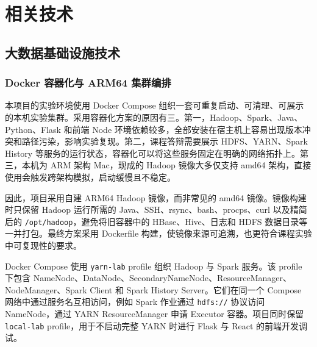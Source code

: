 
\chapter{相关技术}

\section{大数据基础设施技术}

\subsection{Docker 容器化与 ARM64 集群编排}

本项目的实验环境使用 Docker Compose 组织一套可重复启动、可清理、可展示的本机实验集群\cite{docker_compose_overview}。采用容器化方案的原因有三。第一，Hadoop、Spark、Java、Python、Flask 和前端 Node 环境依赖较多，全部安装在宿主机上容易出现版本冲突和路径污染，影响实验复现。第二，课程答辩需要展示 HDFS、YARN、Spark History 等服务的运行状态，容器化可以将这些服务固定在明确的网络拓扑上。第三，本机为 ARM 架构 Mac，现成的 Hadoop 镜像大多仅支持 amd64 架构，直接使用会触发跨架构模拟，启动缓慢且不稳定。

因此，项目采用自建 ARM64 Hadoop 镜像，而非常见的 amd64 镜像。镜像构建时只保留 Hadoop 运行所需的 Java、SSH、rsync、bash、procps、curl 以及精简后的 \texttt{/opt/hadoop}，避免将旧容器中的 HBase、Hive、日志和 HDFS 数据目录等一并打包。最终方案采用 Dockerfile 构建，使镜像来源可追溯，也更符合课程实验中可复现性的要求。

Docker Compose 使用 \texttt{yarn-lab} profile 组织 Hadoop 与 Spark 服务。该 profile 下包含 NameNode、DataNode、SecondaryNameNode、ResourceManager、NodeManager、Spark Client 和 Spark History Server。它们在同一个 Compose 网络中通过服务名互相访问，例如 Spark 作业通过 \texttt{hdfs://} 协议访问 NameNode，通过 YARN ResourceManager 申请 Executor 容器。项目同时保留 \texttt{local-lab} profile，用于不启动完整 YARN 时进行 Flask 与 React 的前端开发调试。

